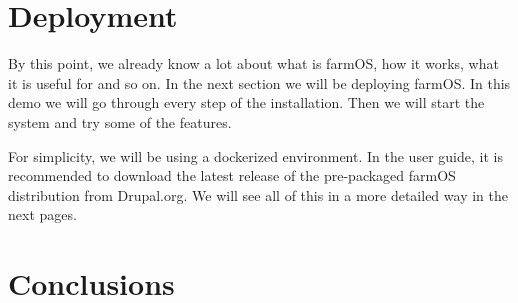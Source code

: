\section{Deployment}
By this point, we already know a lot about what is farmOS, how it works, what it is useful for and so on. In the next section we will be deploying farmOS. In this demo we will go through every step of the installation. Then we will start the system and try some of the features.

For simplicity, we will be using a dockerized environment. In the user guide, it is recommended to download the latest release of the pre-packaged farmOS distribution from Drupal.org. We will see all of this in a more detailed way in the next pages.

\section{Conclusions}
